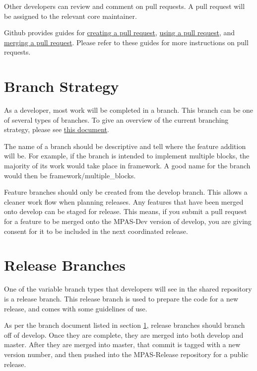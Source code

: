 \documentclass[11pt]{report}
\begin{document}
Other developers can review and comment on pull requests. A pull request will
be assigned to the relevant core maintainer.

Github provides guides for
\href{https://help.github.com/articles/creating-a-pull-request}{creating a pull
request}, \href{https://help.github.com/articles/using-pull-requests}{using a
pull request}, and
\href{https://help.github.com/articles/merging-a-pull-request}{merging a pull
request}. Please refer
to these guides for more instructions on pull requests.

\section{Branch Strategy}
\label{sec:branches}
As a developer, most work will be completed in a branch. This branch can be one
of several types of branches. To give an overview of the current branching
strategy, please see
\href{http://nvie.com/posts/a-successful-git-branching-model/}{this document}. 

The name of a branch should be descriptive and tell where the feature addition
will be. For example, if the branch is intended to implement multiple blocks,
the majority of its work would take place in framework. A good name for the
branch would then be framework/multiple\_blocks.

Feature branches should only be created from the develop branch. This allows a
cleaner work flow when planning releases. Any features that have been merged
onto develop can be staged for release. This means, if you submit a pull
request for a feature to be merged onto the MPAS-Dev version of develop, you
are giving consent for it to be included in the next coordinated release.

\section{Release Branches}
\label{sec:release-branches}
One of the variable branch types that developers will see in the shared
repository is a release branch. This release branch is used to prepare the code
for a new release, and comes with some guidelines of use.

As per the branch document listed in section \ref{sec:branches}, release
branches should branch off of develop. Once they are complete, they are merged
into both develop and master. After they are merged into master, that commit is
tagged with a new version number, and then pushed into the MPAS-Release
repository for a public release.
\end{document}
